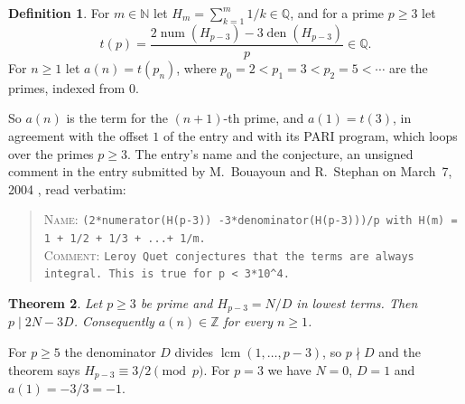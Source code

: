 \documentclass[11pt]{amsart}
\theoremstyle{plain}
\newtheorem{theorem}{Theorem}
\theoremstyle{definition}
\newtheorem{definition}[theorem]{Definition}
\newcommand{\N}{\mathbb{N}}
\newcommand{\Q}{\mathbb{Q}}
\newcommand{\Z}{\mathbb{Z}}
\DeclareMathOperator{\num}{num}
\DeclareMathOperator{\den}{den}
\begin{document}
\begin{definition}\label{def:main}
For $m\in\N$ let $H_m=\sum_{k=1}^{m}1/k\in\Q$, and for a prime $p\ge3$ let
\[
  t(p)=\frac{2\num(H_{p-3})-3\den(H_{p-3})}{p}\in\Q.
\]
For $n\ge1$ let $a(n)=t(p_n)$, where $p_0=2<p_1=3<p_2=5<\cdots$ are the primes, indexed from $0$.
\end{definition}

So $a(n)$ is the term for the $(n+1)$-th prime, and $a(1)=t(3)$, in agreement with the offset $1$ of the entry and with its PARI program, which loops over the primes $p\ge3$. The entry's name and the conjecture, an unsigned comment in the entry submitted by M.~Bouayoun and R.~Stephan on March~7, 2004 \cite{A091817}, read verbatim:
\begin{quote}\raggedright
\textsc{Name}: \texttt{(2*numerator(H(p-3)) -3*denominator(H(p-3)))/p with H(m) = 1 + 1/2 + 1/3 + ...+ 1/m.}\\[2pt]
\textsc{Comment}: \texttt{Leroy Quet conjectures that the terms are always integral. This is true for p < 3*10\^{}4.}
\end{quote}

\begin{theorem}\label{thm:main}
Let $p\ge3$ be prime and $H_{p-3}=N/D$ in lowest terms. Then $p\mid 2N-3D$. Consequently $a(n)\in\Z$ for every $n\ge1$.
\end{theorem}

For $p\ge5$ the denominator $D$ divides $\operatorname{lcm}(1,\dots,p-3)$, so $p\nmid D$ and the theorem says $H_{p-3}\equiv3/2\pmod p$. For $p=3$ we have $N=0$, $D=1$ and $a(1)=-3/3=-1$.
\end{document}
